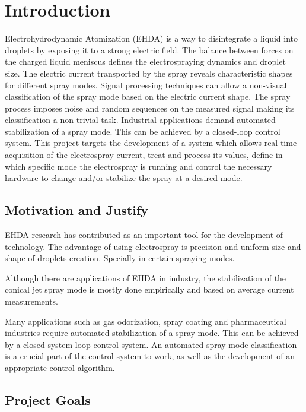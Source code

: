 \chapter{Introduction}
\label{chap:intro} 

Electrohydrodynamic Atomization (EHDA) is a way to disintegrate a liquid into droplets by exposing it to a strong electric field.\cite{prunet}
The balance between forces on the charged liquid meniscus defines the electrospraying dynamics and droplet size.
The electric current transported by the spray reveals characteristic shapes for different spray modes.
Signal processing techniques can allow a non-visual classification of the spray mode based on the electric current shape.\cite{Sjaaks}
The spray process imposes noise and random sequences on the measured signal making its classification a non-trivial task. 
Industrial applications demand automated stabilization of a spray mode. 
This can be achieved by a closed-loop control system. 
This project targets the development of a system which allows real time acquisition of the electrospray current, treat and process its values, define in which specific mode the electrospray is running and control the necessary hardware to change and/or stabilize the spray at a desired mode.


\section{Motivation and Justify}
\label{sec:motivation}

EHDA research has contributed as an important tool for the development of technology. 
The advantage of using electrospray is precision and uniform size and shape of droplets creation. 
Specially in certain spraying modes.

Although there are applications of EHDA in industry, the stabilization of the conical jet spray mode is mostly done empirically and based on average current measurements.

Many applications such as gas odorization, spray coating and pharmaceutical industries require automated stabilization of a spray mode. 
This can be achieved by a closed system loop control system. 
An automated spray mode classification is a crucial part of the control system to work, as well as the development of an appropriate control algorithm.

\section{Project Goals}
\label{sec:goals}

